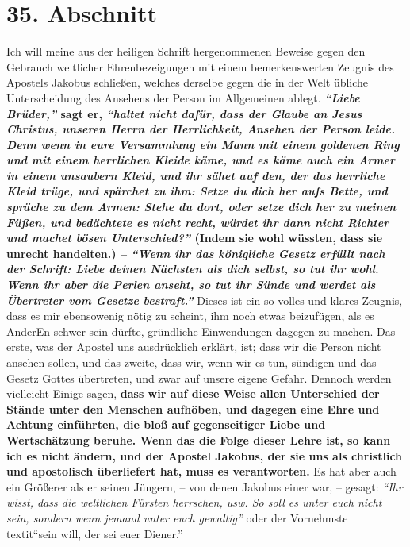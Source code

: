 \section{35. Abschnitt} \label{kap9_ab35}

Ich will meine aus der heiligen Schrift hergenommenen Beweise gegen den Gebrauch
weltlicher Ehrenbezeigungen mit einem bemerkenswerten Zeugnis des Apostels
Jakobus schließen, welches derselbe gegen die in der Welt übliche Unterscheidung
des Ansehens der Person im Allgemeinen ablegt. 
\textbf{\textit{"`Liebe Brüder,"'} sagt er,
\textit{"`haltet nicht dafür, dass der Glaube an Jesus Christus, unseren Herrn
der
Herrlichkeit, Ansehen der Person leide. Denn wenn in eure Versammlung ein Mann
mit einem goldenen Ring und mit einem herrlichen Kleide käme, und es käme auch
ein Armer in einem unsaubern Kleid, und ihr sähet auf den, der das herrliche
Kleid trüge, und spärchet zu ihm: Setze du dich her aufs Bette, und spräche zu
dem Armen: Stehe du dort, oder setze dich her zu meinen Füßen, und bedächtete es
nicht recht, würdet ihr dann nicht Richter und machet bösen Unterschied?"'}
(Indem sie wohl wüssten, dass sie unrecht handelten.) --\textit{ "`Wenn ihr das
königliche
Gesetz erfüllt nach der Schrift: Liebe deinen Nächsten als dich selbst, so tut
ihr wohl. Wenn ihr aber die Perlen anseht, so tut ihr Sünde und werdet
als Übertreter vom Gesetze bestraft."'}}
Dieses ist
ein so volles und klares Zeugnis, dass es mir ebensowenig nötig zu scheint, ihm
noch etwas beizufügen, als es AnderEn schwer sein dürfte, gründliche
Einwendungen
dagegen zu machen. Das erste, was der Apostel uns ausdrücklich erklärt, ist;
dass
wir die Person nicht ansehen sollen, und das zweite, dass wir, wenn wir es tun,
sündigen und das Gesetz Gottes übertreten, und zwar auf unsere eigene Gefahr.
Dennoch werden vielleicht Einige sagen, \label{ref:09_35_staende_abschaffen}
\textbf{dass wir auf diese Weise allen
Unterschied der Stände unter den Menschen aufhöben, und dagegen eine Ehre und
Achtung einführten, die bloß auf gegenseitiger Liebe und Wertschätzung beruhe.
Wenn das die Folge dieser Lehre ist, so kann ich es nicht ändern, und der
Apostel Jakobus, der sie uns als christlich und apostolisch überliefert hat,
muss es verantworten.} Es hat aber auch ein Größerer als er seinen Jüngern, --
von denen Jakobus einer war, -- gesagt:
\textit{"`Ihr wisst, dass die weltlichen Fürsten
herrschen, usw. So soll es unter euch nicht sein, sondern wenn jemand unter
euch gewaltig"'} oder der Vornehmste\\textit{"`sein will, der sei euer
Diener."'}

